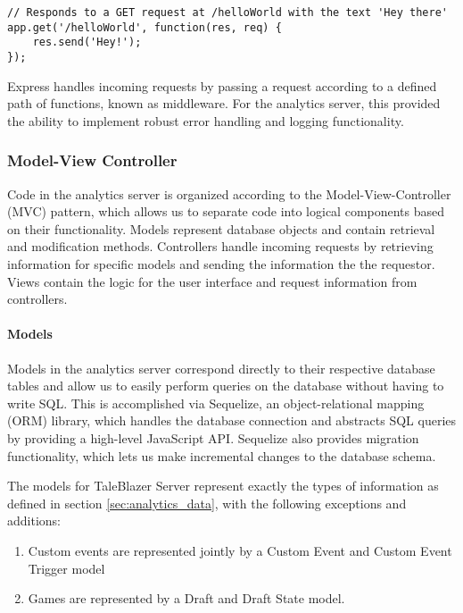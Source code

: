 \medskip
\begin{lstlisting}[caption=Example Express Routing]
// Responds to a GET request at /helloWorld with the text 'Hey there'
app.get('/helloWorld', function(res, req) {
	res.send('Hey!');
});
\end{lstlisting}

Express handles incoming requests by passing a request according to a defined path of functions, known as middleware. For the analytics server, this provided the ability to implement robust error handling and logging functionality. 

\subsubsection{Model-View Controller}

Code in the analytics server is organized according to the Model-View-Controller (MVC) pattern, which allows us to separate code into logical components based on their functionality. Models represent database objects and contain retrieval and modification methods. Controllers handle incoming requests by retrieving information for specific models and sending the information the the requestor. Views contain the logic for the user interface and request information from controllers. 

\paragraph{Models} 
Models in the analytics server correspond directly to their respective database tables and allow us to easily perform queries on the database without having to write SQL. This is accomplished via Sequelize, an object-relational mapping (ORM) library, which handles the database connection and abstracts SQL queries by providing a high-level JavaScript API. Sequelize also provides migration functionality, which lets us make incremental changes to the database schema. 

The models for TaleBlazer Server represent exactly the types of information as defined in section \ref{sec:analytics_data}, with the following exceptions and additions:

	\begin{enumerate}
		\item Custom events are represented jointly by a Custom Event and Custom Event Trigger model
		\item Games are represented by a Draft and Draft State model.
	\end{enumerate}

